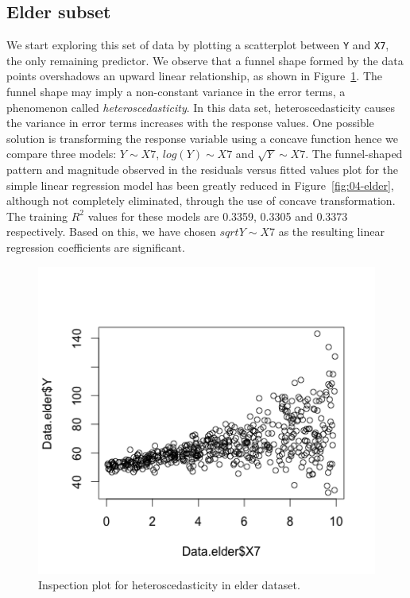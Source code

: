 \documentclass{article}
\begin{document}
\subsection{Elder subset}

We start exploring this set of data by plotting a scatterplot between {\tt Y} and {\tt X7}, the only remaining predictor. We observe that a funnel shape formed by the data points overshadows an upward linear relationship, as shown in Figure~\ref{fig:03-elder}. The funnel shape may imply a non-constant variance in the error terms, a phenomenon called {\em heteroscedasticity}. In this data set, heteroscedasticity causes the variance in error terms increases with the response values. One possible solution is transforming the response variable using a concave function hence we compare three models: $Y \sim X7$, $log(Y) \sim X7$ and $\sqrt{Y} \sim X7$. The funnel-shaped pattern and magnitude observed in the residuals versus fitted values plot for the simple linear regression model has been greatly reduced in Figure~\ref{fig:04-elder}, although not completely eliminated, through the use of concave transformation. The training $R^2$ values for these models are 0.3359, 0.3305 and 0.3373 respectively. Based on this, we have chosen $sqrt{Y} \sim X7$ as the resulting linear regression coefficients are significant.

\begin{figure}[h!]
  \includegraphics[width=\linewidth]{project/images/03-elder.png}
  \caption{Inspection plot for heteroscedasticity in elder dataset.}
  \label{fig:03-elder}
\end{figure}
\end{document}
